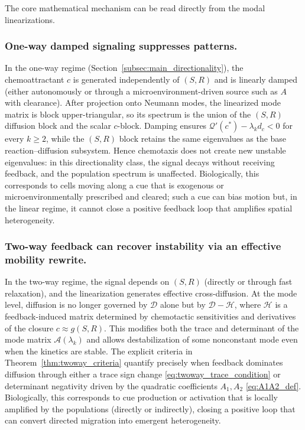 \documentclass[pdflatex,sn-mathphys-ay]{sn-jnl}
\theoremstyle{thmstyleone}
\theoremstyle{definition}
\theoremstyle{remark}
\begin{document}
The core mathematical mechanism can be read directly from the modal linearizations.

\subsubsection{One-way damped signaling suppresses patterns.}
In the one-way regime (Section~\ref{subsec:main_directionality}), the chemoattractant $c$ is generated independently of $(S,R)$ and is
linearly damped (either autonomously or through a microenvironment-driven source such as $A$ with clearance).
After projection onto Neumann modes, the linearized mode matrix is block upper-triangular, so its spectrum is the union of the $(S,R)$ diffusion block and the scalar $c$-block.
Damping ensures $\mathcal{Q}'(c^*)-\lambda_k d_c<0$ for every $k\ge2$, while the $(S,R)$ block retains the same eigenvalues as the base
reaction--diffusion subsystem. Hence chemotaxis does not create new unstable eigenvalues: in this directionality class, the signal
decays without receiving feedback, and the population spectrum is unaffected. Biologically, this corresponds to cells moving along a cue
that is exogenous or microenvironmentally prescribed and cleared; such a cue can bias motion but, in the linear regime, it cannot close a
positive feedback loop that amplifies spatial heterogeneity.

\subsubsection{Two-way feedback can recover instability via an effective mobility rewrite.}
In the two-way regime, the signal depends on $(S,R)$ (directly or through fast relaxation), and the linearization generates effective
cross-diffusion. At the mode level, diffusion is no longer governed by $\mathcal{D}$ alone but by $\mathcal{D}-\mathcal{H}$, where
$\mathcal{H}$ is a feedback-induced matrix determined by chemotactic sensitivities and derivatives of the closure $c\approx g(S,R)$.
This modifies both the trace and determinant of the mode matrix $\mathcal{A}(\lambda_k)$ and allows destabilization of some nonconstant
mode even when the kinetics are stable. The explicit criteria in Theorem~\ref{thm:twoway_criteria} quantify precisely when feedback
dominates diffusion through either a trace sign change \eqref{eq:twoway_trace_condition} or determinant negativity driven by the quadratic
coefficients $A_1,A_2$ \eqref{eq:A1A2_def}. Biologically, this corresponds to cue production or activation that is locally amplified by
the populations (directly or indirectly), closing a positive loop that can convert directed migration into emergent heterogeneity.
\end{document}
